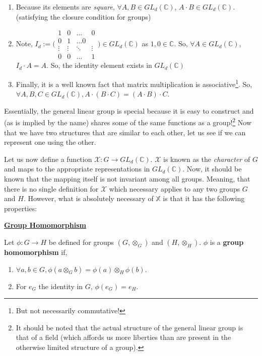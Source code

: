 \documentclass[11pt]{book}
\begin{document}
\begin{center}
	\begin{enumerate}
		\item[1.] Because its elements are \emph{square}, $\forall A, B \in GL_d(\mathbb{C})$, $A \cdot B \in GL_d(\mathbb{C})$. (satisfying the closure condition for 
			groups)\\
		\item[2.] Note, $I_d := \Bigg( \begin{matrix} 1 & 0 & \dots & 0\\ 0 & 1 & \dots 0\\ \vdots & \vdots & \ddots & \vdots\\ 0 & 0 & \dots & 1 \end{matrix} \Bigg) \in GL_d(\mathbb{C})$ 
				as $1,0 \in \mathbb{C}$. So, $\forall A \in GL_d(\mathbb{C})$, $I_d \cdot A = A$. So, the identity element exists in $GL_d(\mathbb{C})$\\
		\item[3.] Finally, it is a well known fact that matrix multiplication is associative\footnote{But not necessarily commutative!}. So, $\forall A, B, C \in GL_d(\mathbb{C}), 
			A \cdot (B \cdot C) = (A \cdot B) \cdot C$.
	\end{enumerate}
\end{center}

Essentially, the general linear group is special because it is easy to construct and (as is implied by the name) shares some of the same functions as a group!\footnote{It should be noted that 
the actual structure of the general linear group is that of a field (which affords us more liberties than are present in the otherwise limited structure of a group).} Now that we have two 
structures that are similar to each other, let us see if we can represent one using the other.

Let us now define a function $\mathcal{X}: G \to GL_d(\mathbb{C})$. $\mathcal{X}$ is known as the \emph{character} of $G$ and maps to the appropriate representations in $GL_d(\mathbb{C})$. Now, 
it should be known that the mapping itself is not invariant among all groups. Meaning, that there is no single definition for $\mathcal{X}$ which necessary applies to any two groups $G$ and $H$. 
However, what is absolutely necessary of $\mathbb{X}$ is that it has the following properties:

\begin{defin}
	\begin{center}
		\underline{\textbf{Group Homomorphism}}\\
	\end{center}
	\vspace*{1mm}
	Let $\phi: G \to H$ be defined for groups $(G, \otimes_G)$ and $(H, \otimes_H)$. $\phi$ is a \textbf{group homomorphism} if,
	\begin{enumerate}
		\item[1.] $\forall a,b \in G, \phi(a \otimes_G b) = \phi(a) \otimes_H \phi(b)$.
		\item[2.] For $e_G$ the identity in $G$, $\phi(e_G) = e_H$.
	\end{enumerate}
\end{defin}
\end{document}
